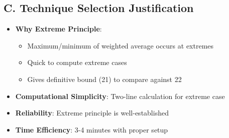 \documentclass[12pt]{article}
\begin{document}
\begin{techniquesbox}
\subsection*{C. Technique Selection Justification}
\begin{itemize}[leftmargin=*]
    \item \textbf{Why Extreme Principle}: 
    \begin{itemize}
        \item Maximum/minimum of weighted average occurs at extremes
        \item Quick to compute extreme cases
        \item Gives definitive bound (21) to compare against 22
    \end{itemize}
    \item \textbf{Computational Simplicity}: Two-line calculation for extreme case
    \item \textbf{Reliability}: Extreme principle is well-established
    \item \textbf{Time Efficiency}: 3-4 minutes with proper setup
\end{itemize}
\end{techniquesbox}
\end{document}
